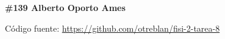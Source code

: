 \documentclass[12pt, twoside]{article}
\begin{document}
\thispagestyle{fancy}
\textbf { \#139 Alberto Oporto Ames }




\vfill
Código fuente: \url{https://github.com/otreblan/fisi-2-tarea-8}
\end{document}

